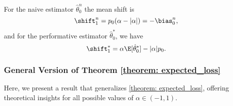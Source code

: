 For the naive estimator $\hat{\theta}_0^n$ the mean shift is  
\begin{equation*}
    \shift_1^n = p_0(\alpha - |\alpha|) = - \bias_0^n,
\end{equation*}
and for the performative estimator $\hat{\theta}_0^\ast$, we have
\begin{equation*}
    \shift_1^\ast = \alpha \E[\hat{\theta}_0^\ast] - |\alpha|p_0.
\end{equation*}

\subsubsection{General Version of Theorem \ref{theorem: expected_loss}}

Here, we present a result that generalizes \cref{theorem: expected_loss},
offering theoretical insights for all possible values of $\alpha \in (-1,1)$.
